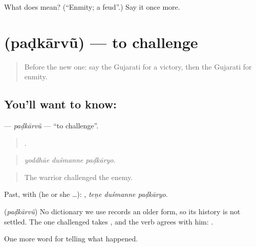 \begin{tcolorbox}[breakable,colback=teal!4,colframe=teal!35!black,title={Before you move on}]
What does  mean? (\textquotedblleft{}Enmity; a feud\textquotedblright{}.) Say it once more.
\end{tcolorbox}
\section[\texorpdfstring{\gu{પડકારવું} (paḍkārvũ)}{પડકારવું (paḍkārvũ)}]{ (paḍkārvũ) — to challenge}

\label{lesson:GU-C323-padkarvu}



\begin{quote}
Before the new one: say the Gujarati for a victory, then the Gujarati for enmity.
\end{quote}

\subsection*{You'll want to know: }
\textbf{} — \emph{paḍkārvũ} — \textquotedblleft{}to challenge\textquotedblright{}.

\begin{quote}
  .
\end{quote}

\begin{quote}
\emph{yoddhāe duśmanne paḍkāryo.}
\end{quote}

\begin{quote}
The warrior challenged the enemy.
\end{quote}

Past, with  (he or she …):   , \emph{teṇe duśmanne paḍkāryo}.

\begin{cousinweb}
\textbf{} (\emph{paḍkārvũ}) No dictionary we use records an older form, so its history is not settled. The one challenged takes \textbf{}, and the verb agrees with him: \textbf{ }.
\end{cousinweb}

\begin{grammarlens}[title={What you've built}]
One more word for telling what happened.
\end{grammarlens}

